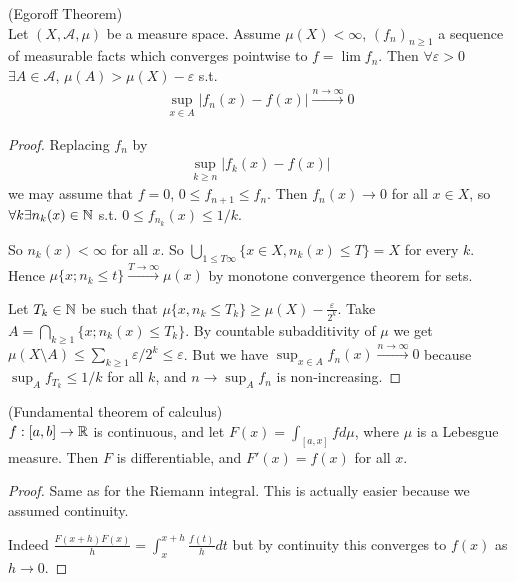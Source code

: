 \documentclass[a4paper]{article}
\begin{document}
\begin{thm} (Egoroff Theorem)\\
Let $(X,\mathcal{A},\mu)$ be a measure space. Assume $\mu(X) < \infty$, $(f_n)_{n \geq 1}$ a sequence of measurable facts which converges pointwise to $f=\lim f_n$. Then $\forall \varepsilon>0$ $\exists A \in \mathcal{A}$, $\mu(A) > \mu(X) -\varepsilon$ s.t. 
\begin{equation*}
\begin{aligned}
\sup_{x \in A} |f_n(x) - f(x)| \xrightarrow{n \to \infty} 0
\end{aligned}
\end{equation*}
\begin{proof}
Replacing $f_n$ by
\begin{equation*}
\begin{aligned}
\sup_{k \geq n} |f_k(x) - f(x)|
\end{aligned}
\end{equation*}
we may assume that $f=0$, $0 \leq f_{n+1} \leq f_n$. Then $f_n(x) \to 0$ for all $x \in X$, so $\forall k \exists n_k(x) \in \mathbb{N}$ s.t. $0 \leq f_{n_k}(x) \leq 1/k$.

So $n_k(x) < \infty$ for all $x$. So $\bigcup_{1 \leq T \infty} \{x \in X, n_k(x) \leq T\} = X$ for every $k$. Hence $\mu\{x ; n_k \leq t\} \xrightarrow{T \to \infty} \mu(x)$ by monotone convergence theorem for sets.

Let $T_k \in \mathbb{N}$ be such that $\mu\{x,n_k \leq T_k\} \geq \mu(X) - \frac{\varepsilon}{2^k}$. Take $A = \bigcap_{k \geq 1} \{x;n_k(x) \leq T_k\}$. By countable subadditivity of $\mu$ we get $\mu (X \setminus A) \leq \sum_{k \geq 1} \varepsilon/2^k \leq \varepsilon$. But we have $\sup_{x \in A} f_n(x) \xrightarrow{n \to \infty} 0$ because $\sup_A f_{T_k} \leq 1/k$ for all $k$, and $n \to \sup_A f_n$ is non-increasing.
\end{proof}
\end{thm}

\begin{thm} (Fundamental theorem of calculus)\\
$f:[a,b] \to \mathbb{R}$ is continuous, and let $F(x) = \int_{[a,x]} f d\mu$, where $\mu$ is a Lebesgue measure. Then $F$ is differentiable, and $F'(x) = f(x)$ for all $x$.

\begin{proof}
Same as for the Riemann integral. This is actually easier because we assumed continuity.

Indeed $\frac{F(x+h)F(x)}{h} = \int_x^{x+h} \frac{f(t)}{h} dt$ but by continuity this converges to $f(x)$ as $h \to 0$.
\end{proof}
\end{thm}
\end{document}
